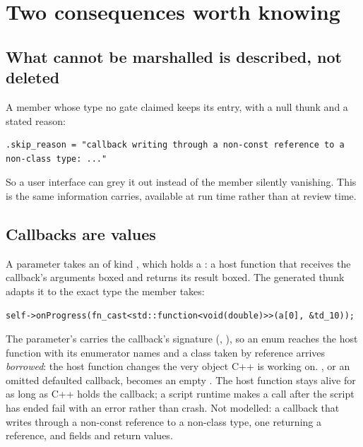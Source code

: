 \section{Two consequences worth knowing}

\subsection*{What cannot be marshalled is described, not deleted}

A member whose type no gate claimed keeps its entry, with a null thunk and a
stated reason:

\begin{lstlisting}[style=cpp]
.skip_reason = "callback writing through a non-const reference to a non-class type: ..."
\end{lstlisting}

So a user interface can grey it out instead of the member silently vanishing.
This is the same information  carries, available at run time
rather than at review time.

\subsection*{Callbacks are values}

A  parameter takes an  of kind
, which holds a : a host function that
receives the callback's arguments boxed and returns its result boxed. The
generated thunk adapts it to the exact type the member takes:

\begin{lstlisting}[style=cpp]
self->onProgress(fn_cast<std::function<void(double)>>(a[0], &td_10));
\end{lstlisting}

The parameter's  carries the callback's signature
(, ), so an enum reaches the host function with
its enumerator names and a class taken by reference arrives \emph{borrowed}:
the host function changes the very object C++ is working on. , or
an omitted defaulted callback, becomes an empty . The
host function stays alive for as long as C++ holds the callback; a script
runtime makes a call after the script has ended fail with an error rather than
crash. Not modelled: a callback that writes through a non-const reference to a
non-class type, one returning a reference, and  fields and
return values.

